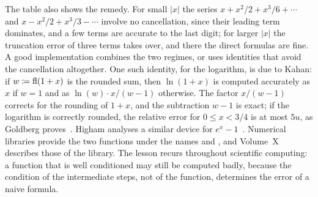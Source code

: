 \begin{table}
\end{table}

The table also shows the remedy. For small $|x|$ the series $x+x^2/2+x^3/6+\cdots$ and $x-x^2/2+x^3/3-\cdots$ involve no cancellation, since their leading term dominates, and a few terms are accurate to the last digit; for larger $|x|$ the truncation error of three terms takes over, and there the direct formulas are fine. A good implementation combines the two regimes, or uses identities that avoid the cancellation altogether. One such identity, for the logarithm, is due to Kahan: if $w\coloneqq\mathop{\mathrm{fl}}\nolimits(1+x)$ is the rounded sum, then $\ln(1+x)$ is computed accurately as $x$ if $w=1$ and as $\ln(w)\cdot x/(w-1)$ otherwise. The factor $x/(w-1)$ corrects for the rounding of $1+x$, and the subtraction $w-1$ is exact; if the logarithm is correctly rounded, the relative error for $0\le x<3/4$ is at most $5u$, as Goldberg proves~\cite[Theorem~4]{goldberg1991}. Higham analyses a similar device for $e^x-1$~\cite[Sect.~1.14.1]{higham2002accuracy}. Numerical libraries provide the two functions under the names  and , and Volume~X describes those of the library. The lesson recurs throughout scientific computing: a function that is well conditioned may still be computed badly, because the condition of the intermediate steps, not of the function, determines the error of a naive formula.

